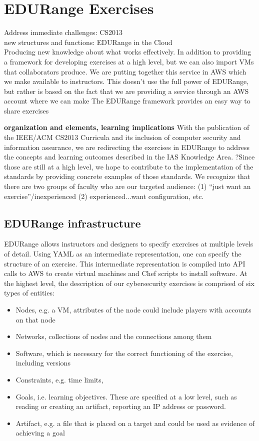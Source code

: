 \section*{EDURange Exercises}

Address immediate challenges: CS2013\\
new structures and functions: EDURange in the Cloud\\
Producing new knowledge about what works effectively.  
In addition to providing a framework for developing exercises at a high level, but we can also 
import VMs that collaborators produce.  We are putting together this service in AWS which we make available
to instructors.  This doesn't use the full power of EDURange, but rather is based on the fact that we
are providing a service through an AWS account where we can make 
The EDURange framework provides an easy way to share exercises 

{\bf organization and elements, learning implications}
With the publication of the IEEE/ACM CS2013 Curricula and its inclusion of computer security and 
information assurance, we are redirecting the exercises in EDURange to address the concepts and learning 
outcomes described in the IAS Knowledge Area.  ?Since those are still at a high level, we hope to contribute
to the implementation of the standards by providing concrete examples of those standards.  We recognize that
there are two groups of faculty who are our targeted audience: (1) ``just want an exercise''/inexperienced
 (2) experienced...want configuration, etc.

\subsection{EDURange infrastructure}
EDURange allows instructors and designers to specify exercises at multiple levels of detail.
Using YAML as an intermediate representation, one can specify the structure of an exercise.
This intermediate representation is compiled into API calls to AWS to create virtual machines and
Chef scripts to install software.  At the highest level, the description of our cybersecurity exercises
is comprised of six types of entities:
\begin{itemize}
  \item Nodes, e.g.  a VM, attributes of the node could include players with accounts on that node
  \item Networks,  collections of nodes and the connections among them
  \item Software, which is necessary for the correct functioning of the exercise, including versions
  \item Constraints, e.g. time limits, 
  \item Goals, i.e. learning objectives.  These are specified at a low level, such as 
    reading or creating an artifact, reporting an IP address or password.
  \item Artifact, e.g. a file that is placed on a target and could be used as evidence of achieving a goal
\end{itemize}


